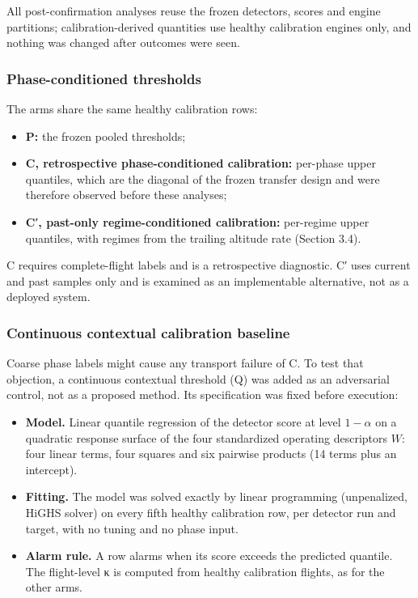 \documentclass[preprint,11pt,a4paper]{elsarticle}
\begin{document}
All post-confirmation analyses reuse the frozen detectors, scores and engine partitions; calibration-derived quantities use healthy calibration engines only, and nothing was changed after outcomes were seen.

\subsubsection{Phase-conditioned thresholds}

The arms share the same healthy calibration rows:
\begin{itemize}
\item \textbf{P:} the frozen pooled thresholds;
\item \textbf{C, retrospective phase-conditioned calibration:} per-phase upper quantiles, which are the diagonal of the frozen transfer design and were therefore observed before these analyses;
\item \textbf{C′, past-only regime-conditioned calibration:} per-regime upper quantiles, with regimes from the trailing altitude rate (Section 3.4).
\end{itemize}

C requires complete-flight labels and is a retrospective diagnostic. C′ uses current and past samples only and is examined as an implementable alternative, not as a deployed system.

\subsubsection{Continuous contextual calibration baseline}

Coarse phase labels might cause any transport failure of C. To test that objection, a continuous contextual threshold (Q) was added as an adversarial control, not as a proposed method. Its specification was fixed before execution:
\begin{itemize}
\item \textbf{Model.} Linear quantile regression of the detector score at level $1-\alpha$ on a quadratic response surface of the four standardized operating descriptors $W$: four linear terms, four squares and six pairwise products (14 terms plus an intercept).
\item \textbf{Fitting.} The model was solved exactly by linear programming (unpenalized, HiGHS solver) on every fifth healthy calibration row, per detector run and target, with no tuning and no phase input.
\item \textbf{Alarm rule.} A row alarms when its score exceeds the predicted quantile. The flight-level κ is computed from healthy calibration flights, as for the other arms.
\end{itemize}
\end{document}
